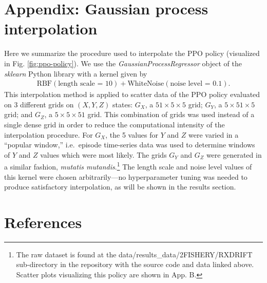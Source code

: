\documentclass{article}
\begin{document}
\hypertarget{appendix-gaussian-process-interpolation}{%
\section{Appendix: Gaussian process
interpolation}\label{appendix-gaussian-process-interpolation}}

Here we summarize the procedure used to interpolate the PPO policy
(visualized in Fig. \ref{fig:ppo-policy}). We use the
\emph{GaussianProcessRegressor} object of the \emph{sklearn} Python
library with a kernel given by \begin{align*}
  \text{RBF}(\text{length scale = 10}) + \text{WhiteNoise}(\text{noise level = 0.1}).
\end{align*} This interpolation method is applied to scatter data of the
PPO policy evaluated on 3 different grids on \((X,Y,Z)\) states:
\(G_X\), a \(51\times 5 \times 5\) grid; \(G_Y\), a
\(5\times 51 \times 5\) grid; and \(G_Z\), a \(5\times 5 \times 51\)
grid. This combination of grids was used instead of a single dense grid
in order to reduce the computational intensity of the interpolation
procedure. For \(G_X\), the 5 values for \(Y\) and \(Z\) were varied in
a ``popular window,'' i.e.~episode time-series data was used to
determine windows of \(Y\) and \(Z\) values which were most likely. The
grids \(G_Y\) and \(G_Z\) were generated in a similar fashion,
\emph{mutatis mutandis}.\footnote{
The raw dataset is found at the data/results\_data/2FISHERY/RXDRIFT sub-directory in the repository with the source code and data linked above.
Scatter plots visualizing this policy are shown in App. B.
} The length scale and noise level values of this kernel were chosen
arbitrarily---no hyperparameter tuning was needed to produce
satisfactory interpolation, as will be shown in the results section.

\hypertarget{references}{%
\section*{References}\label{references}}
\end{document}
